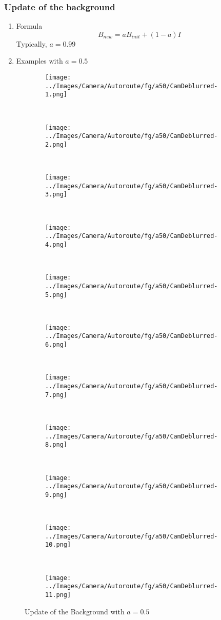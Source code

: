 \begin{frame}
	\frametitle{Update of the background}
\begin{enumerate}
	\item Formula
      $$B_{new} = a B_{init} + (1-a) I$$
	Typically, $a = 0.99$
	\item Examples with $a = 0.5$
\end{enumerate}
%	
\begin{figure}[h]
\centering
\begin{subfigure}{0.20\textwidth}
\texttt{[image: ../Images/Camera/Autoroute/fg/a50/CamDeblurred-1.png]}
\end{subfigure}
~
\begin{subfigure}{0.20\textwidth}
\texttt{[image: ../Images/Camera/Autoroute/fg/a50/CamDeblurred-2.png]}
\end{subfigure}
~
\begin{subfigure}{0.20\textwidth}
\texttt{[image: ../Images/Camera/Autoroute/fg/a50/CamDeblurred-3.png]}
\end{subfigure}
~
\begin{subfigure}{0.20\textwidth}
\texttt{[image: ../Images/Camera/Autoroute/fg/a50/CamDeblurred-4.png]}
\end{subfigure}
~
\begin{subfigure}{0.20\textwidth}
\texttt{[image: ../Images/Camera/Autoroute/fg/a50/CamDeblurred-5.png]}
\end{subfigure}
~
\begin{subfigure}{0.20\textwidth}
\texttt{[image: ../Images/Camera/Autoroute/fg/a50/CamDeblurred-6.png]}
\end{subfigure}
~
\begin{subfigure}{0.20\textwidth}
\texttt{[image: ../Images/Camera/Autoroute/fg/a50/CamDeblurred-7.png]}
\end{subfigure}
~
\begin{subfigure}{0.20\textwidth}
\texttt{[image: ../Images/Camera/Autoroute/fg/a50/CamDeblurred-8.png]}
\end{subfigure}
~
\begin{subfigure}{0.20\textwidth}
\texttt{[image: ../Images/Camera/Autoroute/fg/a50/CamDeblurred-9.png]}
\end{subfigure}
~
\begin{subfigure}{0.20\textwidth}
\texttt{[image: ../Images/Camera/Autoroute/fg/a50/CamDeblurred-10.png]}
\end{subfigure}
~
\begin{subfigure}{0.20\textwidth}
\texttt{[image: ../Images/Camera/Autoroute/fg/a50/CamDeblurred-11.png]}
\end{subfigure}
\caption{Update of the Background with $a=0.5$}
\label{fig:Udpade}
\end{figure}
\end{frame}
